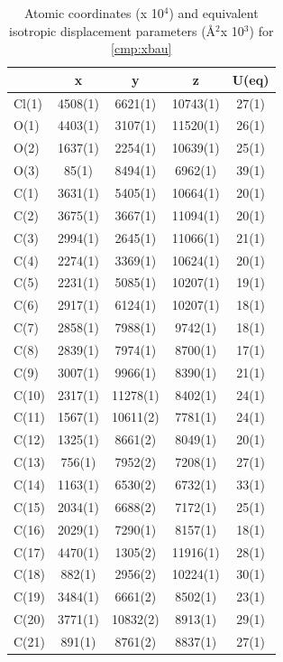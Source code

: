 \twocolumn
\begin{table}[h]
\centering
\caption{Atomic coordinates (x 10$^4$) and equivalent isotropic displacement parameters (\AA$^2$x
10$^3$) for \ref{cmp:xbau}}
{\footnotesize
\begin{tabular}{lcccc} 
\\
\toprule
& x & y & z & U(eq) \\
\midrule
Cl(1)&4508(1)&6621(1)&10743(1)&27(1)\\
O(1)&4403(1)&3107(1)&11520(1)&26(1)\\
O(2)&1637(1)&2254(1)&10639(1)&25(1)\\
O(3)&85(1)&8494(1)&6962(1)&39(1)\\
C(1)&3631(1)&5405(1)&10664(1)&20(1)\\
C(2)&3675(1)&3667(1)&11094(1)&20(1)\\
C(3)&2994(1)&2645(1)&11066(1)&21(1)\\
C(4)&2274(1)&3369(1)&10624(1)&20(1)\\
C(5)&2231(1)&5085(1)&10207(1)&19(1)\\
C(6)&2917(1)&6124(1)&10207(1)&18(1)\\
C(7)&2858(1)&7988(1)&9742(1)&18(1)\\
C(8)&2839(1)&7974(1)&8700(1)&17(1)\\
C(9)&3007(1)&9966(1)&8390(1)&21(1)\\
C(10)&2317(1)&11278(1)&8402(1)&24(1)\\
C(11)&1567(1)&10611(2)&7781(1)&24(1)\\
C(12)&1325(1)&8661(2)&8049(1)&20(1)\\
C(13)&756(1)&7952(2)&7208(1)&27(1)\\
C(14)&1163(1)&6530(2)&6732(1)&33(1)\\
C(15)&2034(1)&6688(2)&7172(1)&25(1)\\
C(16)&2029(1)&7290(1)&8157(1)&18(1)\\
C(17)&4470(1)&1305(2)&11916(1)&28(1)\\
C(18)&882(1)&2956(2)&10224(1)&30(1)\\
C(19)&3484(1)&6661(2)&8502(1)&23(1)\\
C(20)&3771(1)&10832(2)&8913(1)&29(1)\\
C(21)&891(1)&8761(2)&8837(1)&27(1)\\
\bottomrule
\end{tabular}
}
\end{table} 

